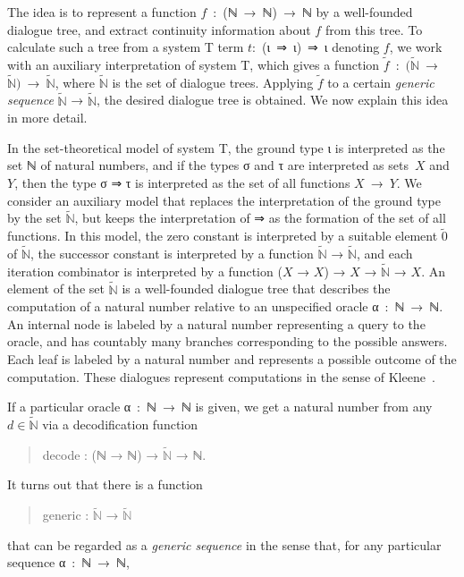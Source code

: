 \documentclass{entcs} \usepackage{prentcsmacro}
\newcommand{\AgdaC}[1]{\mbox{#1}}
\begin{document}
The idea is to represent a function \AgdaC{$f$ : (ℕ → ℕ) → ℕ} by a
well-founded dialogue tree, and extract continuity information about
$f$ from this tree. To calculate such a tree from a system T term
\AgdaC{$t$: (ι ⇒ ι) ⇒ ι} denoting $f$, we work with an auxiliary
interpretation of system T, which gives a function \AgdaC{$\tilde{f}$
: $(\tilde{\mathbb{N}}$ → $\tilde{\mathbb{N}})$ →
$\tilde{\mathbb{N}}$}, where $\tilde{\mathbb{N}}$ is the set of
dialogue trees. Applying $\tilde{f}$ to a certain \emph{generic
sequence} $\tilde{\mathbb{N}}$ → $\tilde{\mathbb{N}}$, the desired
dialogue tree is obtained. We now explain this idea in more detail.

In the set-theoretical model of system T, the ground type ι is
interpreted as the set ℕ of natural numbers, and if the types σ and τ
are interpreted as sets~$X$ and $Y$, then the type σ ⇒ τ is
interpreted as the set of all functions \AgdaC{$X$ → $Y$}. We consider
an auxiliary model that replaces the interpretation of the ground
type by the set $\tilde{\mathbb{N}}$, but keeps the interpretation of
⇒ as the formation of the set of all functions. In this 
model, the zero constant is interpreted by a suitable element
$\tilde{0}$ of $\tilde{\mathbb{N}}$, the successor constant is
interpreted by a function $\tilde{\mathbb{N}}$ → $\tilde{\mathbb{N}}$,
and each iteration combinator is interpreted by a function
($X$ → $X$) → $X$ → $\tilde{\mathbb{N}}$ → $X$. An element of the set
$\tilde{\mathbb{N}}$ is a well-founded dialogue tree that describes
the computation of a natural number relative to an unspecified oracle
\AgdaC{α : ℕ → ℕ}. An internal node is labeled by a natural number
representing a query to the oracle, and has countably many branches
corresponding to the possible answers. Each leaf is labeled by a
natural number and represents a possible outcome of the computation.
These dialogues represent computations in the sense of
Kleene~\cite{KleeneSC:rfqftI}.

If a particular oracle \AgdaC{α : ℕ → ℕ} is given, we get a natural
number from any \AgdaC{$d \in \tilde{\mathbb{N}}$} via a
decodification function
\begin{quote}
  decode : (ℕ → ℕ) → $\tilde{\mathbb{N}}$ → ℕ. 
\end{quote} 
It turns out that there is a function
\begin{quote}
  generic : $\tilde{\mathbb{N}}$ → $\tilde{\mathbb{N}}$
\end{quote}
that can be regarded as a \emph{generic sequence} in the sense that,
for any particular sequence \AgdaC{α : ℕ → ℕ},
\end{document}
